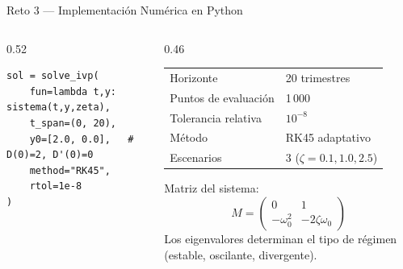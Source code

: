 \documentclass[10pt,aspectratio=169]{beamer}
\begin{document}
\begin{frame}{Reto 3 — Implementación Numérica en Python}
\begin{columns}[T]
\begin{column}{0.52\textwidth}
\begin{lstlisting}
sol = solve_ivp(
    fun=lambda t,y: sistema(t,y,zeta),
    t_span=(0, 20),
    y0=[2.0, 0.0],   # D(0)=2, D'(0)=0
    method="RK45",
    rtol=1e-8
)
      \end{lstlisting}
    \end{column}
    \begin{column}{0.46\textwidth}
      \begin{tcolorbox}[resultbox={Parámetros de simulación}]
        \small
        \renewcommand{\arraystretch}{1.25}
        \begin{tabular}{ll}
          Horizonte & 20 trimestres \\
          Puntos de evaluación & 1\,000 \\
          Tolerancia relativa & $10^{-8}$ \\
          Método & RK45 adaptativo \\
          Escenarios & 3 ($\zeta=0.1,1.0,2.5$) \\
        \end{tabular}
      \end{tcolorbox}
      \vspace{6pt}
      \begin{tcolorbox}[alertbox={Análisis de valores propios}]
        \small
        Matriz del sistema:
        \[
          M = \begin{pmatrix} 0 & 1 \\ -\omega_0^2 & -2\zeta\omega_0 \end{pmatrix}
        \]
        Los eigenvalores determinan el tipo de régimen
        (estable, oscilante, divergente).
      \end{tcolorbox}
    \end{column}
  \end{columns}
\end{frame}
\end{document}
